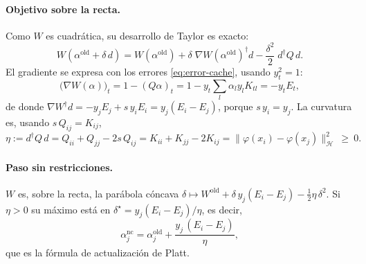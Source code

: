 \documentclass[11pt,a4paper]{article}
\newcommand{\Hk}{\mathcal{H}}
\newcommand{\dg}{\dagger}                         %
\newcommand{\norm}[1]{\lVert #1\rVert}
\theoremstyle{plain}
\theoremstyle{definition}
\theoremstyle{remark}
\numberwithin{equation}{section}
\begin{document}
\paragraph{Objetivo sobre la recta.} Como $W$ es cuadrática, su desarrollo de Taylor es exacto:
\begin{equation}\label{eq:smo-quadratic}
  W(\alpha^{\mathrm{old}}+\delta\,d)=W(\alpha^{\mathrm{old}})
  +\delta\;\nabla W(\alpha^{\mathrm{old}})^{\dg}d-\frac{\delta^2}{2}\;d^{\dg}Q\,d .
\end{equation}
El gradiente se expresa con los errores \eqref{eq:error-cache}, usando $y_t^2=1$:
\begin{equation}\label{eq:dual-gradient}
  \bigl(\nabla W(\alpha)\bigr)_t=1-(Q\alpha)_t=1-y_t\sum_{l}\alpha_ly_lK_{tl}=-y_tE_t ,
\end{equation}
de donde $\nabla W^{\dg}d=-y_jE_j+s\,y_iE_i=y_j(E_i-E_j)$, porque $s\,y_i=y_j$. La curvatura
es, usando $s\,Q_{ij}=K_{ij}$,
\begin{equation}\label{eq:smo-eta}
  \eta:=d^{\dg}Q\,d=Q_{ii}+Q_{jj}-2s\,Q_{ij}=K_{ii}+K_{jj}-2K_{ij}
  =\norm{\varphi(x_i)-\varphi(x_j)}_{\Hk}^2\ \ge\ 0 .
\end{equation}

\paragraph{Paso sin restricciones.} $W$ es, sobre la recta, la parábola cóncava
$\delta\mapsto W^{\mathrm{old}}+\delta\,y_j(E_i-E_j)-\frac12\eta\,\delta^2$. Si $\eta>0$ su
máximo está en $\delta^\star=y_j(E_i-E_j)/\eta$, es decir,
\begin{equation}\label{eq:smo-step}
  \alpha_j^{\mathrm{nc}}=\alpha_j^{\mathrm{old}}+\frac{y_j\,(E_i-E_j)}{\eta},
\end{equation}
que es la fórmula de actualización de Platt.
\end{document}
